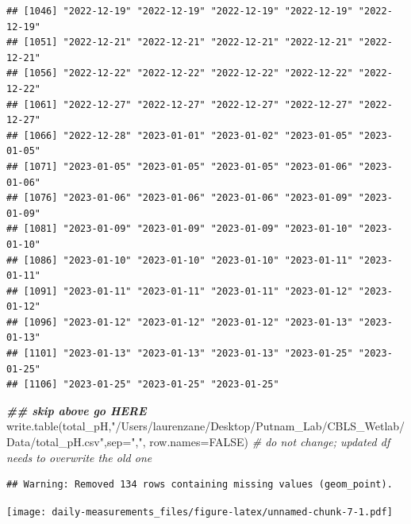 \documentclass[
]{article}
\newenvironment{Shaded}{\begin{snugshade}}{\end{snugshade}}
\newcommand{\AttributeTok}[1]{\textcolor[rgb]{0.77,0.63,0.00}{#1}}
\newcommand{\CommentTok}[1]{\textcolor[rgb]{0.56,0.35,0.01}{\textit{#1}}}
\newcommand{\ConstantTok}[1]{\textcolor[rgb]{0.00,0.00,0.00}{#1}}
\newcommand{\DocumentationTok}[1]{\textcolor[rgb]{0.56,0.35,0.01}{\textbf{\textit{#1}}}}
\newcommand{\FunctionTok}[1]{\textcolor[rgb]{0.00,0.00,0.00}{#1}}
\newcommand{\NormalTok}[1]{#1}
\newcommand{\StringTok}[1]{\textcolor[rgb]{0.31,0.60,0.02}{#1}}
\begin{document}
\begin{verbatim}
## [1046] "2022-12-19" "2022-12-19" "2022-12-19" "2022-12-19" "2022-12-19"
## [1051] "2022-12-21" "2022-12-21" "2022-12-21" "2022-12-21" "2022-12-21"
## [1056] "2022-12-22" "2022-12-22" "2022-12-22" "2022-12-22" "2022-12-22"
## [1061] "2022-12-27" "2022-12-27" "2022-12-27" "2022-12-27" "2022-12-27"
## [1066] "2022-12-28" "2023-01-01" "2023-01-02" "2023-01-05" "2023-01-05"
## [1071] "2023-01-05" "2023-01-05" "2023-01-05" "2023-01-06" "2023-01-06"
## [1076] "2023-01-06" "2023-01-06" "2023-01-06" "2023-01-09" "2023-01-09"
## [1081] "2023-01-09" "2023-01-09" "2023-01-09" "2023-01-10" "2023-01-10"
## [1086] "2023-01-10" "2023-01-10" "2023-01-10" "2023-01-11" "2023-01-11"
## [1091] "2023-01-11" "2023-01-11" "2023-01-11" "2023-01-12" "2023-01-12"
## [1096] "2023-01-12" "2023-01-12" "2023-01-12" "2023-01-13" "2023-01-13"
## [1101] "2023-01-13" "2023-01-13" "2023-01-13" "2023-01-25" "2023-01-25"
## [1106] "2023-01-25" "2023-01-25" "2023-01-25"
\end{verbatim}

\begin{Shaded}
\begin{Highlighting}[]
\DocumentationTok{\#\# skip above go HERE}
\FunctionTok{write.table}\NormalTok{(total\_pH,}\StringTok{"/Users/laurenzane/Desktop/Putnam\_Lab/CBLS\_Wetlab/Data/total\_pH.csv"}\NormalTok{,}\AttributeTok{sep=}\StringTok{","}\NormalTok{, }\AttributeTok{row.names=}\ConstantTok{FALSE}\NormalTok{) }\CommentTok{\# do not change; updated df needs to overwrite the old one}
\end{Highlighting}
\end{Shaded}

\begin{verbatim}
## Warning: Removed 134 rows containing missing values (geom_point).
\end{verbatim}

\texttt{[image: daily-measurements\_files/figure-latex/unnamed-chunk-7-1.pdf]}
\end{document}
